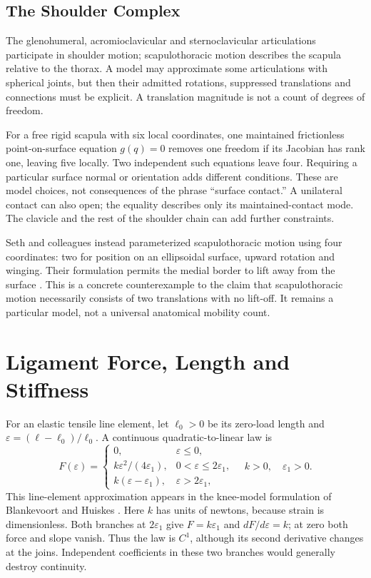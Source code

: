 \subsection{The Shoulder Complex}

The glenohumeral, acromioclavicular and sternoclavicular articulations participate
in shoulder motion; scapulothoracic motion describes the scapula relative to the
thorax. A model may approximate some articulations with spherical joints, but
then their admitted rotations, suppressed translations and connections must be
explicit. A translation magnitude is not a count of degrees of freedom.

For a free rigid scapula with six local coordinates, one maintained frictionless
point-on-surface equation $g(q)=0$ removes one freedom if its Jacobian has rank
one, leaving five locally. Two independent such equations leave four. Requiring
a particular surface normal or orientation adds different conditions. These are
model choices, not consequences of the phrase ``surface contact.'' A unilateral
contact can also open; the equality describes only its maintained-contact mode.
The clavicle and the rest of the shoulder chain can add further constraints.

Seth and colleagues instead parameterized scapulothoracic motion using four
coordinates: two for position on an ellipsoidal surface, upward rotation and
winging. Their formulation permits the medial border to lift away from the
surface \cite{Seth2016ScapulaJoint}. This is a concrete counterexample to the claim
that scapulothoracic motion necessarily consists of two translations with no
lift-off. It remains a particular model, not a universal anatomical mobility count.

\section{Ligament Force, Length and Stiffness}

For an elastic tensile line element, let $\ell_0>0$ be its zero-load length and
$\varepsilon=(\ell-\ell_0)/\ell_0$. A continuous quadratic-to-linear law is
\begin{equation}
 F(\varepsilon)=
 \begin{cases}
 0,&\varepsilon\le0,\\
 k\varepsilon^2/(4\varepsilon_1),&0<\varepsilon\le2\varepsilon_1,\\
 k(\varepsilon-\varepsilon_1),&\varepsilon>2\varepsilon_1,
 \end{cases}
 \quad k>0,\quad\varepsilon_1>0.
 \label{eq:ch4:ligament-force}
\end{equation}
This line-element approximation appears in the knee-model formulation of
Blankevoort and Huiskes \cite{Blankevoort1991}. Here $k$ has units of newtons,
because strain is dimensionless. Both branches at $2\varepsilon_1$ give
$F=k\varepsilon_1$ and $dF/d\varepsilon=k$; at zero both force and slope vanish.
Thus the law is $C^1$, although its second derivative changes at the joins.
Independent coefficients in these two branches would generally destroy continuity.

